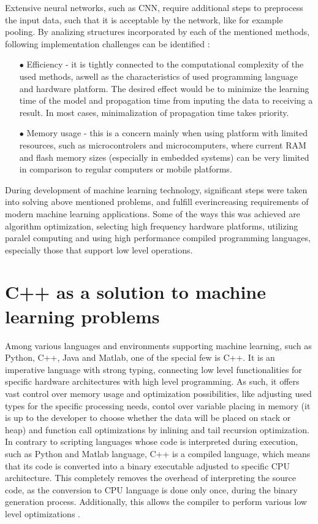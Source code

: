 Extensive neural networks, such as CNN, require additional steps to preprocess the input data, such that it is acceptable by the network, like for example pooling. By analizing structures incorporated by each of the mentioned methods, following implementation challenges can be identified \cite{constrained}:

\begin{itemize}
    \item [$\bullet$] Efficiency - it is tightly connected to the computational complexity of the used methods, aswell as the characteristics of used programming language and hardware platform. The desired effect would be to minimize the learning time of the model and propagation time from inputing the data to receiving a result. In most cases, minimalization of propagation time takes priority.
    
    \item [$\bullet$] Memory usage - this is a concern mainly when using platform with limited resources, such as microcontrolers and microcomputers, where current RAM and flash memory sizes (especially in embedded systems) can be very limited in comparison to regular computers or mobile platforms.
\end{itemize}

During development of machine learning technology, significant steps were taken into solving above mentioned problems, and fulfill everincreasing requirements of modern machine learning applications. Some of the ways this was achieved are algorithm optimization, selecting high frequency hardware platforms, utilizing paralel computing and using high performance compiled programming languages, especially those that support low level operations. 

\section{C++ as a solution to machine learning problems}

Among various languages and environments supporting machine learning, such as Python, C++, Java and Matlab, one of the special few is C++. It is an imperative language with strong typing, connecting low level functionalities for specific hardware architectures with high level programming. As such, it offers vast control over memory usage and optimization possibilities, like adjusting used types for the specific processing needs, contol over variable placing in memory (it is up to the developer to choose whether the data will be placed on stack or heap) and function call optimizations by inlining and tail recursion optimization. In contrary to scripting languages whose code is interpreted during execution, such as Python and Matlab language, C++ is a compiled language, which means that its code is converted into a binary executable adjusted to specific CPU architecture. This completely removes the overhead of interpreting the source code, as the conversion to CPU language is done only once, during the binary generation process. Additionally, this allows the compiler to perform various low level optimizations \cite{cpp_char}.

